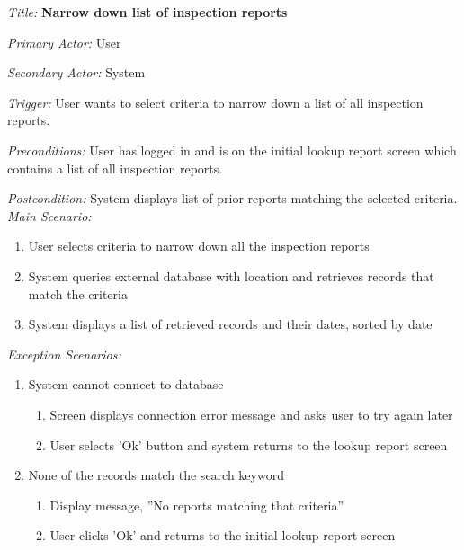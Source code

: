 \documentclass[twoside,letterpaper]{article}
\begin{document}
\textit{Title: }{\bfseries\color{black}Narrow down list of inspection reports}

{\color{black} \textit{Primary Actor:} User}

{\color{black} \textit{Secondary Actor:} System}

{\color{black} \textit{Trigger:} User wants to select criteria to narrow down a list of all inspection reports.}

{\color{black} \textit{Preconditions:} User has logged in and is on the initial lookup report screen which contains a list of all inspection reports.}

{\color{black} \textit{Postcondition:} System displays list of prior reports matching the selected criteria.}
\newline
{\color{black} \textit{Main Scenario:}}\
\begin{enumerate}
\item User selects criteria to narrow down all the inspection reports
\item System queries external database with location and retrieves records that match the criteria
\item System displays a list of retrieved records and their dates, sorted by date
\end{enumerate}
{\color{black} \textit{Exception Scenarios:}}
\begin{enumerate}
\item System cannot connect to database
\begin{enumerate}
\item Screen displays connection error message and asks user to try again later
\item User selects 'Ok' button and system returns to the lookup report screen
\end{enumerate}

\item None of the records match the search keyword
\begin{enumerate}
\item Display message, ''No reports matching that criteria''
\item User clicks 'Ok' and returns to the initial lookup report screen
\end{enumerate}
\end{enumerate}
\end{document}
